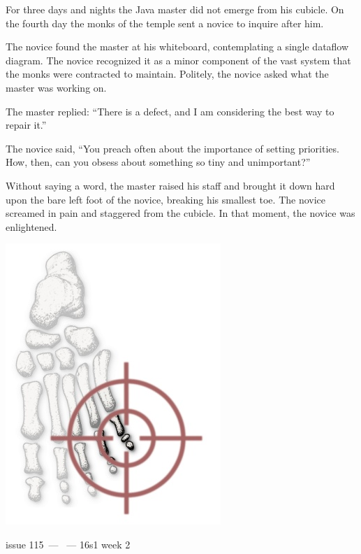\documentclass[twoside]{article}
\makeatletter
\gdef\the@issue{115}
\makeatother
\begin{document}
\begin{multicols}{2}

For three days and nights the Java master did not emerge from his cubicle. On the fourth day the monks of the temple sent a novice to inquire after him.

The novice found the master at his whiteboard, contemplating a single dataflow diagram. The novice recognized it as a minor component of the vast system that the monks were contracted to maintain. Politely, the novice asked what the master was working on.

The master replied: “There is a defect, and I am considering the best way to repair it.”

The novice said, “You preach often about the importance of setting priorities. How, then, can you obsess about something so tiny and unimportant?”

Without saying a word, the master raised his staff and brought it down hard upon the bare left foot of the novice, breaking his smallest toe. The novice screamed in pain and staggered from the cubicle. In that moment, the novice was enlightened.

\includegraphics[width=0.7\linewidth]{images/foot.jpg}


\end{multicols}

\hfill

\fontsize{12pt}{12pt}\makeatletter issue \the@issue\ --- \@date\ --- 16s1 week 2
\end{document}
